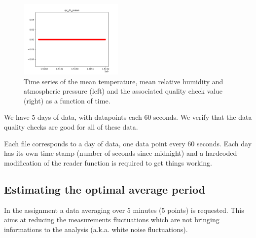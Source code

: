 \documentclass[11pt]{amsart}
\begin{document}
\begin{figure}
    \includegraphics[width=0.45\textwidth]{../plots/qc_rh_mean.pdf}
    \caption{\label{fig:ts-data}Time series of the mean temperature, mean relative humidity and atmospheric pressure (left) and the associated quality check value (right) as a function of time.}
\end{figure}
We have 5 days of data, with datapoints each 60 seconds.
We verify that the data quality checks are good for all of these data.

Each file corresponds to a day of data, one data point every 60 seconds.
Each day has its own time stamp (number of seconds since midnight) and a hardcoded-modification of the reader function is required to get things working.

\subsection{Estimating the optimal average period}

In the assignment a data averaging over 5 minutes (5 points) is requested.
This aims at reducing the measurements fluctuations which are not bringing informations to the analysis (a.k.a. white noise fluctuations).
\end{document}

